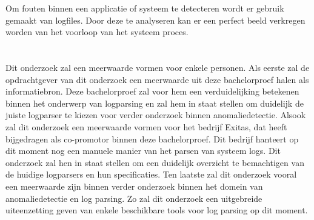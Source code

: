 Om fouten binnen een applicatie of systeem te detecteren wordt er gebruik gemaakt van logfiles. Door deze te analyseren kan er een perfect beeld verkregen worden van het voorloop van het systeem proces.

\section{}
\label{sec:probleemstelling}


Dit onderzoek zal een meerwaarde vormen voor enkele personen. Als eerste zal de opdrachtgever van dit onderzoek een meerwaarde uit deze bachelorproef halen als informatiebron. Deze bachelorproef zal voor hem een verduidelijking betekenen binnen het onderwerp van logparsing en zal hem in staat stellen om duidelijk de juiste logparser te kiezen voor verder onderzoek binnen anomaliedetectie. Alsook zal dit onderzoek een meerwaarde vormen voor het bedrijf Exitas, dat heeft bijgedragen als co-promotor binnen deze bachelorproef. Dit bedrijf hanteert op dit moment nog een manuele manier van het parsen van systeem logs. Dit onderzoek zal hen in staat stellen om een duidelijk overzicht te bemachtigen van de huidige logparsers en hun specificaties. Ten laatste zal dit onderzoek vooral een meerwaarde zijn binnen verder onderzoek binnen het domein van anomaliedetectie en log parsing. Zo zal dit onderzoek een uitgebreide uiteenzetting geven van enkele beschikbare tools voor log parsing op dit moment. 


\section{}
\label{sec:onderzoeksvraag}


